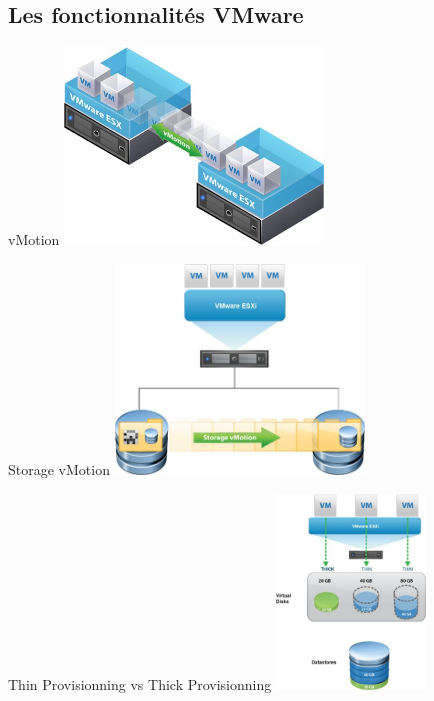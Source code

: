 \subsection{Les fonctionnalités VMware}

\begin{center}
\begin{frame}{vMotion}
\includegraphics[width=260px]{Schemas/vMotion.jpg}
\end{frame}
\end{center}

\begin{center}
\begin{frame}{Storage vMotion}
\includegraphics[width=250px]{Schemas/Storage_vMotion.jpg}
\end{frame}
\end{center}

\begin{center}
\begin{frame}{Thin Provisionning vs Thick Provisionning}
\includegraphics[width=150px]{Schemas/Thin_Provisionning.jpg}
\end{frame}
\end{center}

